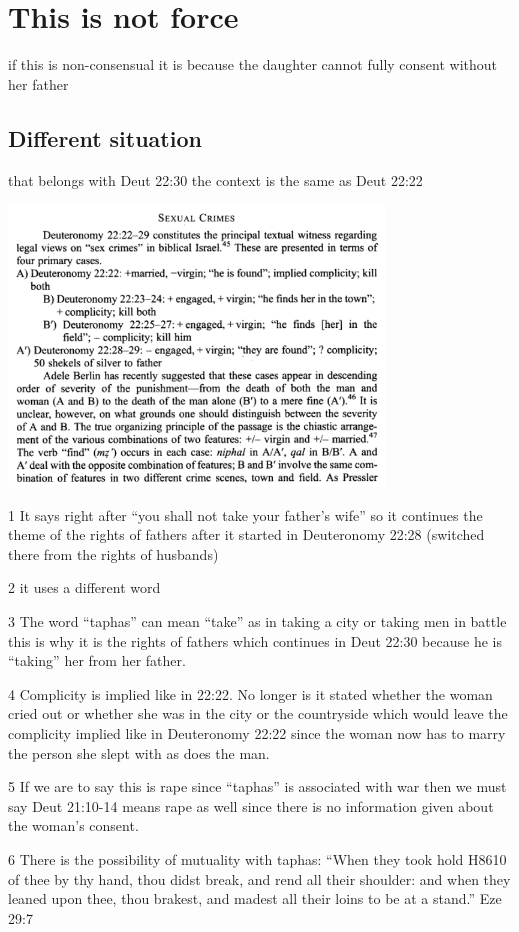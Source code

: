 \documentclass[11pt]{article}
\begin{document}
\section{This is not force}

 if this is non-consensual it is because the daughter cannot fully consent without her father
\subsection{Different situation}
that belongs with Deut 22:30 the context is the same as Deut 22:22

\includegraphics[width=10cm]{sexual_crimes}


1 It says right after “you shall not take your father’s wife” so it continues the theme of the rights of fathers after it started in Deuteronomy 22:28 (switched there from the rights of husbands)

2 it uses a different word

3 The word “taphas” can mean “take” as in taking a city or taking men in battle this is why it is the rights of fathers which continues in Deut 22:30 because he is “taking” her from her father.

4 Complicity is implied like in 22:22. No longer is it stated whether the woman cried out or whether she was in the city or the countryside which would leave the complicity implied like in Deuteronomy 22:22 since the woman now has to marry the person she slept with as does the man.

5 If we are to say this is rape since “taphas” is associated with war then we must say Deut 21:10-14 means rape as well since there is no information given about the woman’s consent.

6 There is the possibility of mutuality with taphas: “When they took hold H8610 of thee by thy hand, thou didst break, and rend all their shoulder: and when they leaned upon thee, thou brakest, and madest all their loins to be at a stand.” Eze 29:7
\end{document}
